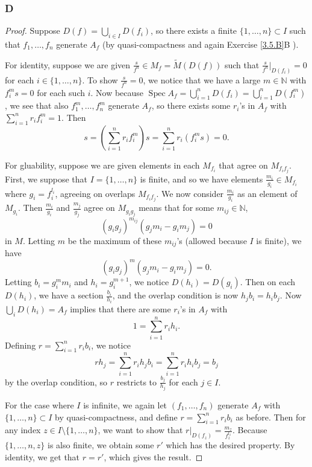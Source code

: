 \documentclass{article}
\newcommand{\N}{\mathbb{N}}
\DeclareMathOperator{\Spec}{\mathrm{Spec}}
\begin{document}
\subsubsection{D}\label{4.1.D}
\begin{proof}
    Suppose $D(f)=\bigcup_{i\in I} D(f_i)$, so there exists a finite $\{1, \dots, n\}\subset I$ such that $f_1, \dots, f_n$ generate $A_f$ (by quasi-compactness and again Exercise \ref{3.5.B}B
    ).

    For identity, suppose we are given $\frac{s}{f^n}\in M_f = \widetilde M(D(f))$ such that $\frac{s}{f^n}\vert_{D(f_i)}=0$ for each $i\in \{1, \dots, n\}$. To show $\frac{s}{f^n}=0$, we notice that we have a large $m\in \N$ with $f_i^m s =0$ for each such $i$. Now because $\Spec A_f = \bigcup_{i=1}^n D(f_i) = \bigcup_{i=1}^n D(f_i^m)$, we see that also $f_1^m, \dots, f_n^m$ generate $A_f$, so there exists some $r_i$'s in $A_f$ with $\sum_{i=1}^n r_i f_i^m =1$. Then
    \[
    s=(\sum_{i=1}^n r_i f_i^m)s = \sum_{i=1}^n r_i(f_i^m s) = 0.
    \]

    For gluability, suppose we are given elements in each $M_{f_i}$ that agree on $M_{f_i f_j}$. First, we suppose that $I=\{1, \dots, n\}$ is finite, and so we have elements $\frac{m_i}{g_i}\in M_{f_i}$ where $g_i=f_i^{l_i}$, agreeing on overlaps $M_{f_if_j}$. We now consider $\frac{m_i}{g_i}$ as an element of $M_{g_i}$. Then $\frac{m_i}{g_i}$ and $\frac{m_j}{g_j}$ agree on $M_{g_ig_j}$ means that for some $m_{ij}\in \N$,
    \[
    (g_ig_j)^{m_{ij}}(g_jm_i-g_im_j)=0
    \]
    in $M$. Letting $m$ be the maximum of these $m_{ij}$'s (allowed because $I$ is finite), we have
    \[
    (g_i g_j)^m (g_j m_i-g_i m_j)=0.
    \]
    Letting $b_i=g_i^m m_i$ and $h_i=g_i^{m+1}$, we notice $D(h_i)=D(g_i)$. Then on each $D(h_i)$, we have a section $\frac{b_i}{h_i}$, and the overlap condition is now $h_j b_i = h_i b_j$. Now $\bigcup_i D(h_i) = A_f$ implies that there are some $r_i$'s in $A_f$ with
    \[
    1=\sum_{i=1}^n r_i h_i.
    \]
    Defining $r=\sum_{i=1}^n r_i b_i$, we notice
    \[
    rh_j=\sum_{i=1}^n r_i h_j b_i = \sum_{i=1}^n r_i h_i b_j= b_j
    \]
    by the overlap condition, so $r$ restricts to $\frac{b_j}{h_j}$ for each $j\in I$.

    For the case where $I$ is infinite, we again let $(f_1, \dots, f_n)$ generate $A_f$ with $\{1, \dots, n\} \subset I$ by quasi-compactness, and define $r=\sum_{i=1}^n r_i b_i$ as before. Then for any index $z\in I\setminus \{1, \dots, n\}$, we want to show that $r\vert_{D(f_z)}=\frac{m_z}{f_z^{l_z}}$. Because $\{1, \dots, n, z\}$ is also finite, we obtain some $r'$ which has the desired property. By identity, we get that $r=r'$, which gives the result.


\end{proof}
\end{document}
